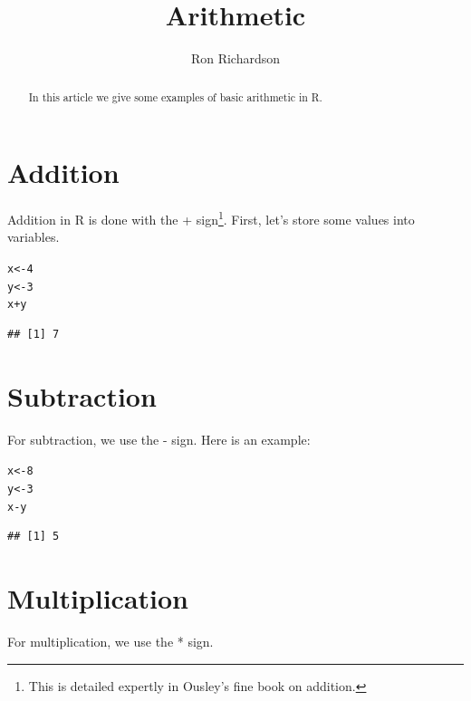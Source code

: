 \documentclass{article}\usepackage[]{graphicx}\usepackage[]{color}
\makeatletter
\newcommand{\hlnum}[1]{\textcolor[rgb]{0.686,0.059,0.569}{#1}}%
\newcommand{\hlopt}[1]{\textcolor[rgb]{0,0,0}{#1}}%
\newcommand{\hlstd}[1]{\textcolor[rgb]{0.345,0.345,0.345}{#1}}%
\newcommand{\hlkwb}[1]{\textcolor[rgb]{0.69,0.353,0.396}{#1}}%
\newenvironment{kframe}{%
 \def\at@end@of@kframe{}%
 \ifinner\ifhmode%
  \def\at@end@of@kframe{\end{minipage}}%
  \begin{minipage}{\columnwidth}%
 \fi\fi%
 \def\FrameCommand##1{\hskip\@totalleftmargin \hskip-\fboxsep
 \colorbox{shadecolor}{##1}\hskip-\fboxsep
     \hskip-\linewidth \hskip-\@totalleftmargin \hskip\columnwidth}%
 \MakeFramed {\advance\hsize-\width
   \@totalleftmargin\z@ \linewidth\hsize
   \@setminipage}}%
 {\par\unskip\endMakeFramed%
 \at@end@of@kframe}
\newenvironment{knitrout}{}{} %
\makeatother
\begin{document}
\title{Arithmetic}
\author{Ron Richardson}
\maketitle

\begin{abstract}
In this article we give some examples of basic arithmetic in R.
\end{abstract}

\section{Addition}
Addition in R is done with the + sign\footnote{This is detailed expertly in Ousley's fine book on addition.}. First, let's store some values into variables.

\begin{knitrout}
\color{fgcolor}\begin{kframe}
\begin{alltt}
\hlstd{x}\hlkwb{<-}\hlnum{4}
\hlstd{y}\hlkwb{<-}\hlnum{3}
\hlstd{x}\hlopt{+}\hlstd{y}
\end{alltt}
\begin{verbatim}
## [1] 7
\end{verbatim}
\end{kframe}
\end{knitrout}

\section{Subtraction}
For subtraction, we use the - sign. Here is an example:

\begin{knitrout}
\color{fgcolor}\begin{kframe}
\begin{alltt}
\hlstd{x}\hlkwb{<-}\hlnum{8}
\hlstd{y}\hlkwb{<-}\hlnum{3}
\hlstd{x}\hlopt{-}\hlstd{y}
\end{alltt}
\begin{verbatim}
## [1] 5
\end{verbatim}
\end{kframe}
\end{knitrout}

\section{Multiplication}
For multiplication, we use the * sign.
\end{document}
